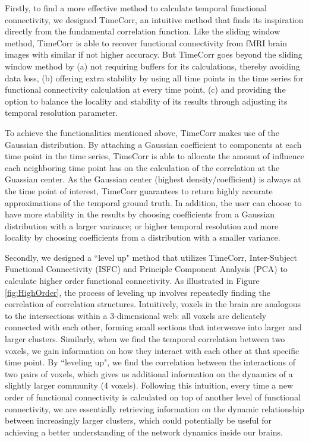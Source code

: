\documentclass[11pt]{article}
\begin{document}
Firstly, to find a more effective method to calculate temporal functional connectivity, we designed TimeCorr, an intuitive method that finds its inspiration directly from the fundamental correlation function. Like the sliding window method, TimeCorr is able to recover functional connectivity from fMRI brain images with similar if not higher accuracy. But TimeCorr goes beyond the sliding window method by (a) not requiring buffers for its calculations, thereby avoiding data loss, (b) offering extra stability by using all time points in the time series for functional connectivity calculation at every time point, (c) and providing the option to balance the locality and stability of its results through adjusting its temporal resolution parameter.

To achieve the functionalities mentioned above, TimeCorr makes use of the Gaussian distribution. By attaching a Gaussian coefficient to components at each time point in the time series, TimeCorr is able to allocate the amount of influence each neighboring time point has on the calculation of the correlation at the Guassian center. As the Gaussian center (highest density/coefficient) is always at the time point of interest, TimeCorr guarantees to return highly accurate approximations of the temporal ground truth. In addition, the user can choose to have more stability in the results by choosing coefficients from a Gaussian distribution with a larger variance; or higher temporal resolution and more locality by choosing coefficients from a distribution with a smaller variance.

Secondly, we designed a ``level up" method that utilizes TimeCorr, Inter-Subject Functional Connectivity (ISFC) and Principle Component Analysis (PCA) to calculate higher order functional connectivity. As illustrated in Figure \ref{fig:HighOrder}, the process of leveling up involves repeatedly finding the correlation of correlation structures. Intuitively, voxels in the brain are analogous to the intersections within a 3-dimensional web: all voxels are delicately connected with each other, forming small sections that interweave into larger and larger clusters. Similarly, when we find the temporal correlation between two voxels, we gain information on how they interact with each other at that specific time point. By ``leveling up", we find the correlation between the interactions of two pairs of voxels, which gives us additional information on the dynamics of a slightly larger community (4 voxels). Following this intuition, every time a new order of functional connectivity is calculated on top of another level of functional connectivity, we are essentially retrieving information on the dynamic relationship between increasingly larger clusters, which could potentially be useful for achieving a better understanding of the network dynamics inside our brains.
\end{document}
